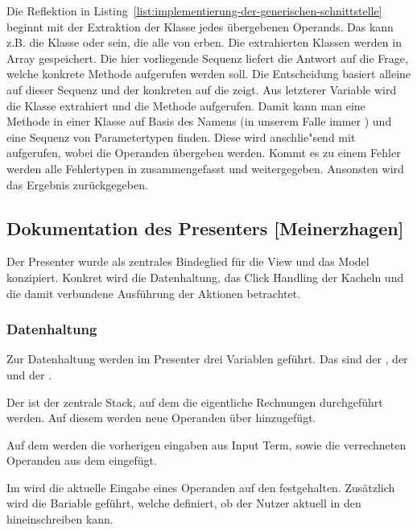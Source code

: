 Die Reflektion in Listing~\ref{list:implementierung-der-generischen-schnittstelle} beginnt mit der Extraktion der Klasse jedes übergebenen Operands. Das kann z.B. die Klasse  oder  sein, die alle von  erben. Die extrahierten Klassen werden in Array  gespeichert. Die hier vorliegende Sequenz liefert die Antwort auf die Frage, welche konkrete Methode aufgerufen werden soll. Die Entscheidung basiert alleine auf dieser Sequenz und der konkreten  auf die  zeigt. Aus letzterer Variable wird die Klasse extrahiert und die Methode  aufgerufen. Damit kann man eine Methode in einer Klasse auf Basis des Namens (in unserem Falle immer ) und eine Sequenz von Parametertypen finden. Diese wird anschlie"send mit  aufgerufen, wobei die Operanden übergeben werden. Kommt es zu einem Fehler werden alle Fehlertypen in  zusammengefasst und weitergegeben. Ansonsten wird das Ergebnis zurückgegeben.

\subsection{Dokumentation des Presenters [Meinerzhagen]}

Der Presenter wurde als zentrales Bindeglied für die View und das Model konzipiert. Konkret wird die Datenhaltung, das Click Handling der Kacheln und die damit verbundene Ausführung der Aktionen betrachtet.
	
\subsubsection{Datenhaltung}

Zur Datenhaltung werden im Presenter drei Variablen geführt. Das sind der , der  und der .

Der  ist der zentrale Stack, auf dem die eigentliche Rechnungen durchgeführt werden. Auf diesem werden neue Operanden über  hinzugefügt.

Auf dem  werden die vorherigen eingaben aus Input Term, sowie die verrechneten Operanden aus dem  eingefügt.

Im   wird die aktuelle Eingabe eines Operanden auf den  festgehalten. Zusätzlich wird die Bariable  geführt, welche definiert, ob der Nutzer aktuell in den  hineinschreiben kann.

